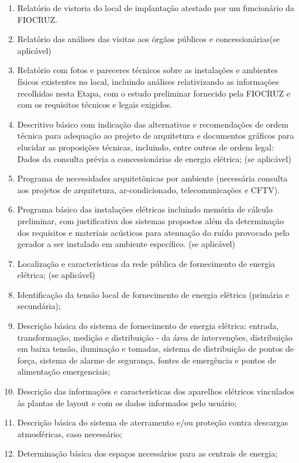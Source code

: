 \begin{enumerate}
	\item Relatório de vistoria do local de implantação atestado por um funcionário da FIOCRUZ.
	\item Relatório das análises das visitas aos órgãos públicos e concessionárias(se aplicável)
	\item Relatório com fotos e pareceres técnicos sobre as instalações e ambientes físicos existentes no local, incluindo análises relativizando as informações recolhidas nesta Etapa, com o estudo preliminar fornecido pela FIOCRUZ e com os requisitos técnicos e legais exigidos. 
	\item Descritivo básico com indicação das alternativas e recomendações de ordem técnica para adequação ao projeto de arquitetura e documentos gráficos para elucidar as proposições técnicas, incluindo, entre outros de ordem legal: Dados da consulta prévia a concessionárias de energia elétrica; (se aplicável)
	\item Programa de necessidades arquitetônicas por ambiente (necessária consulta aos projetos de arquitetura, ar-condicionado, telecomunicações e CFTV).
	\item Programa básico das instalações elétricas incluindo memória de cálculo preliminar, com justificativa dos sistemas propostos além da determinação dos requisitos e materiais acústicos para atenuação do ruído provocado pelo gerador a ser instalado em ambiente específico. (se aplicável)
	\item Localização e características da rede pública de fornecimento de energia elétrica; (se aplicável)
	\item Identificação da tensão local de fornecimento de energia elétrica (primária e secundária); 
	\item Descrição básica do sistema de fornecimento de energia elétrica: entrada, transformação, medição e distribuição - da área de intervenções, distribuição em baixa tensão, iluminação e tomadas, sistema de distribuição de pontos de força, sistema de alarme de segurança, fontes de emergência e pontos de alimentação emergenciais; 
	\item Descrição das informações e características dos aparelhos elétricos vinculados às plantas de layout e com os dados informados pelo usuário; 
	\item Descrição básica do sistema de aterramento e/ou proteção contra descargas atmosféricas, caso necessário;
	\item Determinação básica dos espaços necessários para as centrais de energia;

\end{enumerate}
